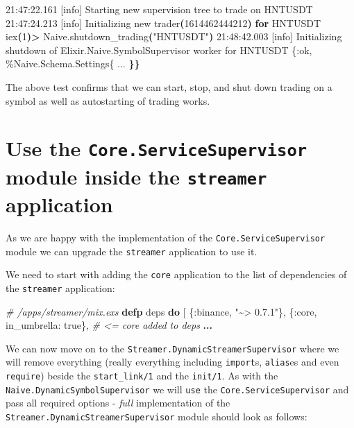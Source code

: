 \documentclass[
]{book}
\newenvironment{Shaded}{\begin{snugshade}}{\end{snugshade}}
\newcommand{\CommentTok}[1]{\textcolor[rgb]{0.56,0.35,0.01}{\textit{#1}}}
\newcommand{\ConstantTok}[1]{\textcolor[rgb]{0.00,0.00,0.00}{#1}}
\newcommand{\ControlFlowTok}[1]{\textcolor[rgb]{0.13,0.29,0.53}{\textbf{#1}}}
\newcommand{\ErrorTok}[1]{\textcolor[rgb]{0.64,0.00,0.00}{\textbf{#1}}}
\newcommand{\ExtensionTok}[1]{#1}
\newcommand{\KeywordTok}[1]{\textcolor[rgb]{0.13,0.29,0.53}{\textbf{#1}}}
\newcommand{\NormalTok}[1]{#1}
\newcommand{\OperatorTok}[1]{\textcolor[rgb]{0.81,0.36,0.00}{\textbf{#1}}}
\newcommand{\StringTok}[1]{\textcolor[rgb]{0.31,0.60,0.02}{#1}}
\newcommand{\VariableTok}[1]{\textcolor[rgb]{0.00,0.00,0.00}{#1}}
\begin{document}
\begin{Shaded}
\begin{Highlighting}[]
\ExtensionTok{21:47:22.161}\NormalTok{ [info]  Starting new supervision tree to trade on HNTUSDT}
\ExtensionTok{21:47:24.213}\NormalTok{ [info]  Initializing new trader}\ErrorTok{(}\ExtensionTok{1614462444212}\KeywordTok{)} \ControlFlowTok{for}\NormalTok{ HNTUSDT}
\ExtensionTok{iex}\ErrorTok{(}\ExtensionTok{1}\KeywordTok{)}\OperatorTok{\textgreater{}}\NormalTok{ Naive.shutdown\_trading}\KeywordTok{(}\StringTok{"HNTUSDT"}\KeywordTok{)}
\ExtensionTok{21:48:42.003}\NormalTok{ [info]  Initializing shutdown of Elixir.Naive.SymbolSupervisor worker for HNTUSDT}
\ExtensionTok{\{:ok,}
 \ExtensionTok{\%Naive.Schema.Settings\{}
   \ExtensionTok{...}
 \ErrorTok{\}\}}
\end{Highlighting}
\end{Shaded}

The above test confirms that we can start, stop, and shut down trading on a symbol as well as autostarting of trading works.

\hypertarget{use-the-core.servicesupervisor-module-inside-the-streamer-application}{%
\section{\texorpdfstring{Use the \texttt{Core.ServiceSupervisor} module inside the \texttt{streamer} application}{Use the Core.ServiceSupervisor module inside the streamer application}}\label{use-the-core.servicesupervisor-module-inside-the-streamer-application}}

As we are happy with the implementation of the \texttt{Core.ServiceSupervisor} module we can upgrade the \texttt{streamer} application to use it.

We need to start with adding the \texttt{core} application to the list of dependencies of the \texttt{streamer} application:

\begin{Shaded}
\begin{Highlighting}[]
\CommentTok{\# /apps/streamer/mix.exs}
  \KeywordTok{defp}\NormalTok{ deps }\KeywordTok{do}
\NormalTok{    [}
\NormalTok{      \{}\VariableTok{:binance}\NormalTok{, }\StringTok{"\textasciitilde{}\textgreater{} 0.7.1"}\NormalTok{\},}
\NormalTok{      \{}\VariableTok{:core}\NormalTok{, }\VariableTok{in\_umbrella:} \ConstantTok{true}\NormalTok{\}, }\CommentTok{\# \textless{}= core added to deps}
      \OperatorTok{...}
\end{Highlighting}
\end{Shaded}

We can now move on to the \texttt{Streamer.DynamicStreamerSupervisor} where we will remove everything (really everything including \texttt{import}s, \texttt{alias}es and even \texttt{require}) beside the \texttt{start\_link/1} and the \texttt{init/1}. As with the \texttt{Naive.DynamicSymbolSupervisor} we will \texttt{use} the \texttt{Core.ServiceSupervisor} and pass all required options - \emph{full} implementation of the \texttt{Streamer.DynamicStreamerSupervisor} module should look as follows:
\end{document}
